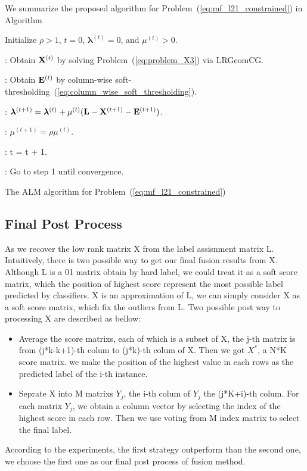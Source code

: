 \documentclass[letterpaper]{article}
\def\bE{{\bf E}}
\def\blambda{{\bm \lambda}}
\def\bL{{\bf L}}
\def\bX{{\bf X}}
\def\bX{{\bf X}}
\begin{document}
We summarize the proposed algorithm for Problem~(\ref{eq:mf_l21_constrained}) in Algorithm~\
\begin{algorithm}[h!]
\begin{algorithmic}
\STATE Initialize $\rho > 1$, $t = 0$, $\blambda^{(t)} = 0$, and $\mu^{(t)} > 0$.

: Obtain $\bX^{(t)}$ by solving Problem~(\ref{eq:problem_X3}) via LRGeomCG.

: Obtain $\bE^{(t)}$ by column-wise soft-thresholding~(\ref{eq:column_wise_soft_thresholding}).

: $\blambda^{(t+1)} = \blambda^{(t)} + \mu^{(t)} (\bL - \bX^{(t+1)} - \bE^{(t+1)})$.

: $\mu^{(t+1)} = \rho \mu^{(t)}$.

: t = t + 1.

: Go to step 1 until convergence.

\end{algorithmic}
\caption{The ALM algorithm for Problem~(\ref{eq:mf_l21_constrained})} \label{Alg:overview_alm}
\end{algorithm}

\subsection{Final Post Process}
As we recover the low rank matrix X from the label assisnment matrix L. Intuitively, there is two possible way to get our final fusion results from X. Although L is a 01 matrix obtain by hard label, we could treat it as a soft score matrix, which the position of highest score represent the most possible label predicted by classifiers. X is an approximation of L, we can simply consider X as a soft score matrix, which fix the outliers from L. Two possible post way to processing X are described as bellow:
\begin{itemize}
  \item Average the score matrixs, each of which is a subset of X, the j-th matrix is from (j*k-k+1)-th colum to (j*k)-th colum of X. Then we got $X^*$, a N*K score matrix. we make the position of the highest value in each rows as the predicted label of the i-th instance.
  \item Seprate X into M matrixs $Y_j$, the i-th colum of $Y_j$ the (j*K+i)-th colum. For each matrix $Y_j$, we obtain a column vector by selecting the index of the highest score in each row. Then we use voting from M index matrix to select the final label.
\end{itemize}
According to the experiments, the first strategy outperform than the second one, we choose the first one as our final post process of fusion method.
\end{document}
